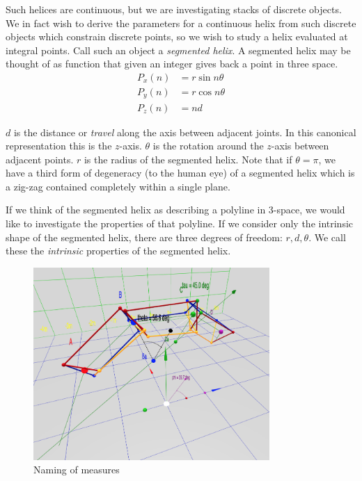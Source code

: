 \documentclass[11pt]{article}
\begin{document}
{Such helices are continuous, but we are investigating stacks of discrete objects. We in fact wish to derive
the parameters for a continuous helix from such discrete objects which constrain discrete points, so we wish
to study a helix evaluated at integral points. Call such an object a {\em segmented helix}.
A segmented helix may be thought of as function that given an integer gives back a point in three space.
\begin{align*}
    P_x(n) &= r \sin{n \theta}  \\
    P_y(n) &= r \cos{n \theta} \\
   P_z(n) &= n d
\end{align*}

$d$ is the distance or {\em travel} along the axis between adjacent joints. In this canonical representation this is
the $z$-axis.
$\theta$ is the rotation around the $z$-axis
between adjacent points.
$r$ is the radius of the segmented helix.
Note that if $\theta = \pi$, we have a third form of degeneracy (to the human eye) of a segmented helix
which is a zig-zag contained completely within a single plane.

If we think of the segmented helix as describing a polyline in 3-space, we would like to investigate
the properties of that polyline. If we consider only the intrinsic shape of the segmented helix, there are three degrees
of freedom: $r,d,\theta$. We call these the {\em intrinsic} properties of the segmented helix.

\begin{figure}
     \centering
     \includegraphics[width=0.80\textwidth]{figures/ABCDFigure.png}
     \caption{Naming of measures}
  \label{fig:naming}
\end{figure}

}
\end{document}

